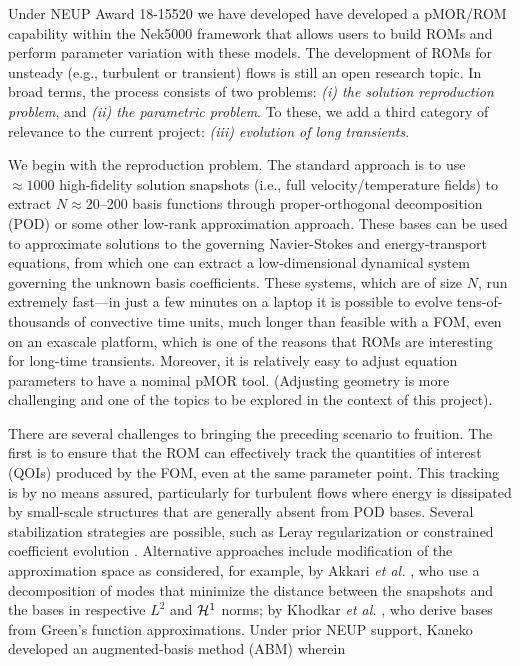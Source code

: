 Under NEUP Award 18-15520 we have developed have developed a pMOR/ROM
capability within the Nek5000 framework that allows users to build ROMs and
perform parameter variation with these models.  The development of ROMs for
unsteady (e.g., turbulent or transient) flows is still an open research topic.
In broad terms, the process consists of two problems: {\em (i) the solution
reproduction problem}, and {\em (ii) the parametric problem}.  To these, we add
a third category of relevance to the current project: {\em (iii) evolution
of long transients}.

We begin with the reproduction problem. The standard approach is to use
$\approx 1000$ high-fidelity solution snapshots (i.e., full velocity/temperature
fields) to extract $N$$\approx$20--200 basis functions through 
proper-orthogonal decomposition (POD) or some other low-rank approximation
approach.  These bases can be used to approximate solutions to the governing
Navier-Stokes and energy-transport equations, from which one can extract a 
low-dimensional dynamical system governing the unknown basis coefficients.  
These systems, which are of size $N$, run extremely fast---in just a few
minutes on a laptop it is possible to evolve tens-of-thousands of convective
time units, much longer than feasible with a FOM, even on an exascale platform,
which is one of the reasons that ROMs are interesting for long-time transients.
Moreover, it is relatively easy to adjust equation parameters to have a nominal
pMOR tool.  (Adjusting geometry is more challenging and one of the topics to be
explored in the context of this project).

There are several challenges to bringing the preceding scenario to fruition.
The first is to ensure that the ROM can effectively track the quantities
of interest (QOIs) produced by the FOM, even at the same parameter point.
This tracking is by no means assured, particularly for turbulent flows
where energy is dissipated by small-scale structures that are generally
absent from POD bases.  Several stabilization strategies are possible,
such as Leray regularization \cite{wang2012proper} or constrained coefficient
evolution \cite{fick}.  Alternative approaches include modification of the
approximation space as considered, for example, by Akkari {\em et al.} 
\cite{akkari19}, who use a decomposition of modes that minimize the distance
between the snapshots and the bases in respective $L^2$ and ${\cal H}^1$ norms;
by Khodkar {\em et al.} \cite{khodkar2019}, who derive bases from 
Green's function approximations.  Under prior NEUP support, Kaneko 
\cite{kaneko22a,kaneko22} developed an augmented-basis method (ABM) wherein  


